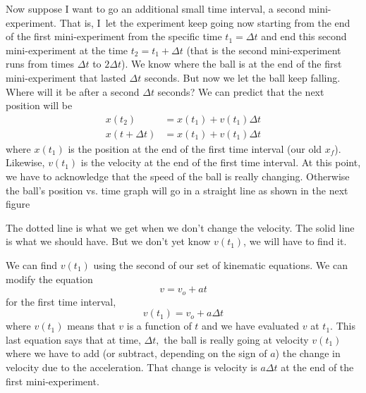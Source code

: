 \documentclass{book}
\begin{document}
Now suppose I want to go an additional small time interval, a second
mini-experiment. That is, I\ let the experiment keep going now starting from
the end of the first mini-experiment from the specific time $t_{1}=\Delta t$
and end this second mini-experiment at the time $t_{2}=t_{1}+\Delta t$ (that
is the second mini-experiment runs from times $\Delta t$ to $2\Delta t$). We
know where the ball is at the end of the first mini-experiment that lasted
$\Delta t$ seconds. But now we let the ball keep falling. Where will it be
after a second $\Delta t$ seconds? We can predict that the next position will
be
\begin{align*}
x(t_{2})  & =x(t_{1})+v(t_{1})\Delta t\\
x(t+\Delta t)  & =x(t_{1})+v(t_{1})\Delta t
\end{align*}
where $x\left(  t_{1}\right)  $ is the position at the end of the first time
interval (our old $x_{f}$). Likewise, $v\left(  t_{1}\right)  $ is the
velocity at the end of the first time interval. At this point, we have to
acknowledge that the speed of the ball is really changing. Otherwise the
ball's position vs. time graph will go in a straight line as shown in the next
figure 
\begin{center}
\end{center}
The dotted line is what we get when we don't change the velocity. The solid
line is what we should have. But we don't yet know $v\left(  t_{1}\right)  $,
we will have to find it.

We can find $v\left(  t_{1}\right)  $ using the second of our set of kinematic
equations. We can modify the equation
\[
v=v_{o}+at
\]
for the first time interval,
\[
v(t_{1})=v_{o}+a\Delta t
\]
where $v(t_{1})$ means that $v$ is a function of $t$ and we have evaluated $v
$ at $t_{1}.$ This last equation says that at time, $\Delta t,$ the ball is
really going at velocity $v\left(  t_{1}\right)  $ where we have to add (or
subtract, depending on the sign of $a$) the change in velocity due to the
acceleration. That change is velocity is $a\Delta t$ at the end of the first mini-experiment.
\end{document}
